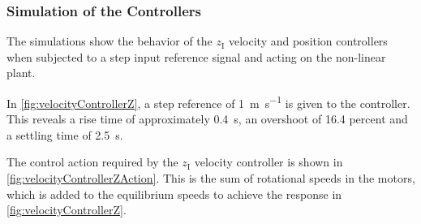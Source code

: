 \subsubsection{Simulation of the Controllers}
The simulations show the behavior of the $z_{\mathrm{I}}$ velocity and position controllers when subjected to a step input reference signal and acting on the non-linear plant.

In \autoref{fig:velocityControllerZ}, a step reference of \SI{1}{m s^{-1}} is given to the controller. This reveals a rise time of approximately \SI{0.4}{s}, an overshoot of 16.4 percent and a settling time of \SI{2.5}{s}.

The control action required by the $z_{\mathrm{I}}$ velocity controller is shown in \autoref{fig:velocityControllerZAction}. This is the sum of rotational speeds in the motors, which is added to the equilibrium speeds to achieve the response in \autoref{fig:velocityControllerZ}.

